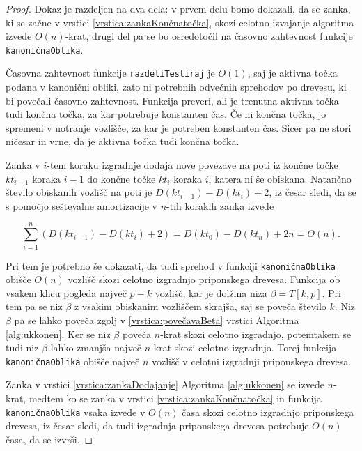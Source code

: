 \begin{proof}

Dokaz je razdeljen na dva dela: v prvem delu bomo dokazali, da se zanka, ki se začne v vrstici \ref{vrstica:zankaKončnatočka}, skozi celotno izvajanje algoritma izvede $O(n)$-krat, drugi del pa se bo osredotočil na časovno zahtevnost funkcije \texttt{kanoničnaOblika}. 

Časovna zahtevnost funkcije \texttt{razdeliTestiraj} je $O(1)$, saj je aktivna točka podana v kanonični obliki, zato ni potrebnih odvečnih sprehodov po drevesu, ki bi povečali časovno zahtevnost. Funkcija preveri, ali je trenutna aktivna točka tudi končna točka, za kar potrebuje konstanten čas. Če ni končna točka, jo spremeni v notranje vozlišče, za kar je potreben konstanten čas. Sicer pa ne stori ničesar in vrne, da je aktivna točka tudi končna točka.

Zanka v $i$-tem koraku izgradnje dodaja nove povezave na poti iz končne točke $kt_{i-1}$ koraka $i-1$ do končne točke $kt_i$ koraka $i$, katera ni še obiskana. Natančno število obiskanih vozlišč na poti je $D(kt_{i-1})-D(kt_i)+2$, iz česar sledi, da se s pomočjo seštevalne amortizacije v $n$-tih korakih zanka izvede


$$
    \sum_{i=1}^n \left(D(kt_{i-1})-D(kt_i)+2\right)=D(kt_0)-D(kt_n)+2n=O(n).
$$

Pri tem je potrebno še dokazati, da tudi sprehod v funkciji \texttt{kanoničnaOblika} obišče $O(n)$ vozlišč skozi celotno izgradnjo priponskega drevesa. Funkcija ob vsakem klicu pogleda največ $p-k$ vozlišč, kar je dolžina niza $\beta=T[k,p]$. Pri tem pa se niz $\beta$ z vsakim obiskanim vozliščem skrajša, saj se poveča število $k$. Niz $\beta$ pa se lahko poveča zgolj v \ref{vrstica:povečavaBeta} vrstici Algoritma \ref{alg:ukkonen}. Ker se niz $\beta$ poveča $n$-krat skozi celotno izgradnjo, potemtakem se tudi niz $\beta$ lahko zmanjša največ $n$-krat skozi celotno izgradnjo. Torej funkcija \texttt{kanoničnaOblika} obišče največ $n$ vozlišč v celotni izgradnji priponskega drevesa.


Zanka v vrstici \ref{vrstica:zankaDodajanje} Algoritma \ref{alg:ukkonen} se izvede $n$-krat, medtem ko se zanka v vrstici \ref{vrstica:zankaKončnatočka} in funkcija \texttt{kanoničnaOblika} vsaka izvede v $O(n)$ časa skozi celotno izgradnjo priponskega drevesa, iz česar sledi, da tudi izgradnja priponskega drevesa potrebuje $O(n)$ časa, da se izvrši.
  
\end{proof}

